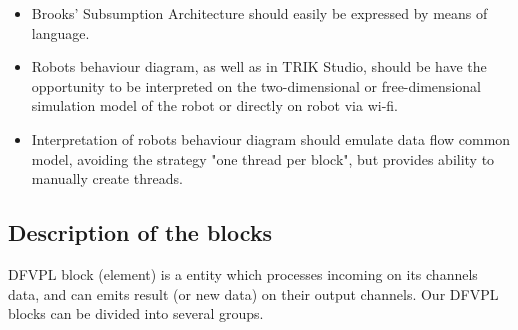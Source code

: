\documentclass[conference,compsoc]{IEEEtran}
\begin{document}
\begin{itemize}
\item Brooks’ Subsumption Architecture should easily be expressed by means of language.
\item Robots behaviour diagram, as well as in TRIK Studio, should be have the opportunity to be interpreted on the two-dimensional or free-dimensional simulation model of the robot or directly on robot via wi-fi.
\item Interpretation  of robots behaviour diagram  should emulate data flow common model, avoiding the strategy "one thread per block", but provides ability to manually create threads.
\end{itemize}


\subsection{Description of the blocks}
DFVPL block (element) is a entity which processes incoming on its channels data, and can emits result (or new data) on their output channels. Our DFVPL blocks can be divided into several groups.
\end{document}
